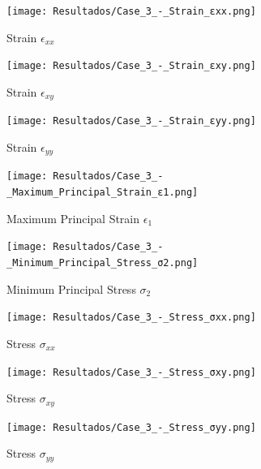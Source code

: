 \documentclass[12pt]{article}
\begin{document}
\begin{figure}[H]
    \centering
    \begin{minipage}{0.48\textwidth}
        \centering
        \texttt{[image: Resultados/Case\_3\_-\_Strain\_εxx.png]}
        \caption{Strain $\epsilon_{xx}$}
        \label{fig:fig26}
    \end{minipage}
    \hfill
    \begin{minipage}{0.48\textwidth}
        \centering
        \texttt{[image: Resultados/Case\_3\_-\_Strain\_εxy.png]}
        \caption{Strain $\epsilon_{xy}$}
        \label{fig:fig27}
    \end{minipage}
\end{figure}

\begin{figure}[H]
    \centering
    \begin{minipage}{0.48\textwidth}
        \centering
        \texttt{[image: Resultados/Case\_3\_-\_Strain\_εyy.png]}
        \caption{Strain $\epsilon_{yy}$}
        \label{fig:fig28}
    \end{minipage}
    \hfill
    \begin{minipage}{0.48\textwidth}
        \centering
        \texttt{[image: Resultados/Case\_3\_-\_Maximum\_Principal\_Strain\_ε1.png]}
        \caption{Maximum Principal Strain $\epsilon_1$}
        \label{fig:fig29}
    \end{minipage}
\end{figure}

\begin{figure}[H]
    \centering
    \begin{minipage}{0.48\textwidth}
        \centering
        \texttt{[image: Resultados/Case\_3\_-\_Minimum\_Principal\_Stress\_σ2.png]}
        \caption{Minimum Principal Stress $\sigma_2$}
        \label{fig:fig30}
    \end{minipage}
    \hfill
    \begin{minipage}{0.48\textwidth}
        \centering
        \texttt{[image: Resultados/Case\_3\_-\_Stress\_σxx.png]}
        \caption{Stress $\sigma_{xx}$}
        \label{fig:fig31}
    \end{minipage}
\end{figure}

\begin{figure}[H]
    \centering
    \begin{minipage}{0.48\textwidth}
        \centering
        \texttt{[image: Resultados/Case\_3\_-\_Stress\_σxy.png]}
        \caption{Stress $\sigma_{xy}$}
        \label{fig:fig32}
    \end{minipage}
    \hfill
    \begin{minipage}{0.48\textwidth}
        \centering
        \texttt{[image: Resultados/Case\_3\_-\_Stress\_σyy.png]}
        \caption{Stress $\sigma_{yy}$}
        \label{fig:fig33}
    \end{minipage}
\end{figure}
\end{document}
